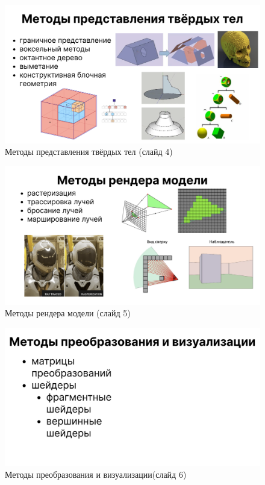 \begin{figure}[h]
	\centering
	\captionsetup{justification=centering}
	\includegraphics[width=150mm]{img/slide4.png}
	\caption{Методы представления твёрдых тел (слайд 4)}
	\label{fig:slide-4}
\end{figure}

\begin{figure}[h]
	\centering
	\captionsetup{justification=centering}
	\includegraphics[width=150mm]{img/slide5.png}
	\caption{Методы рендера модели (слайд 5)}
	\label{fig:slide-5}
\end{figure}

\begin{figure}[h]
	\centering
	\captionsetup{justification=centering}
	\includegraphics[width=150mm]{img/slide6.png}
	\caption{Методы преобразования и визуализации(слайд 6)}
	\label{fig:slide-6}
\end{figure}


